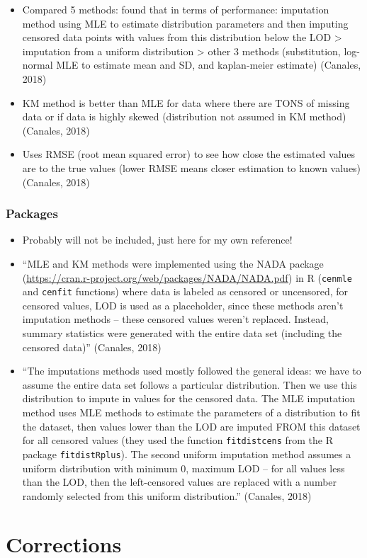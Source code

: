 \documentclass[12pt, twoside]{amherstthesis}
\begin{document}
\begin{itemize}
\item
  Compared 5 methods: found that in terms of performance: imputation method using MLE to estimate distribution parameters and then imputing censored data points with values from this distribution below the LOD \textgreater{} imputation from a uniform distribution \textgreater{} other 3 methods (substitution, log-normal MLE to estimate mean and SD, and kaplan-meier estimate) (Canales, 2018)
\item
  KM method is better than MLE for data where there are TONS of missing data or if data is highly skewed (distribution not assumed in KM method) (Canales, 2018)
\item
  Uses RMSE (root mean squared error) to see how close the estimated values are to the true values (lower RMSE means closer estimation to known values) (Canales, 2018)
\end{itemize}
\hypertarget{packages}{%
\subsection{Packages}\label{packages}}
\begin{itemize}
\item
  Probably will not be included, just here for my own reference!
\item
  ``MLE and KM methods were implemented using the NADA package (\url{https://cran.r-project.org/web/packages/NADA/NADA.pdf}) in R (\texttt{cenmle} and \texttt{cenfit} functions) where data is labeled as censored or uncensored, for censored values, LOD is used as a placeholder, since these methods aren't imputation methods -- these censored values weren't replaced. Instead, summary statistics were generated with the entire data set (including the censored data)'' (Canales, 2018)
\item
  ``The imputations methods used mostly followed the general ideas: we have to assume the entire data set follows a particular distribution. Then we use this distribution to impute in values for the censored data. The MLE imputation method uses MLE methods to estimate the parameters of a distribution to fit the dataset, then values lower than the LOD are imputed FROM this dataset for all censored values (they used the function \texttt{fitdistcens} from the R package \texttt{fitdistRplus}). The second uniform imputation method assumes a uniform distribution with minimum 0, maximum LOD -- for all values less than the LOD, then the left-censored values are replaced with a number randomly selected from this uniform distribution.'' (Canales, 2018)
\end{itemize}
\hypertarget{corrections}{%
\chapter*{Corrections}\label{corrections}}
\end{document}
